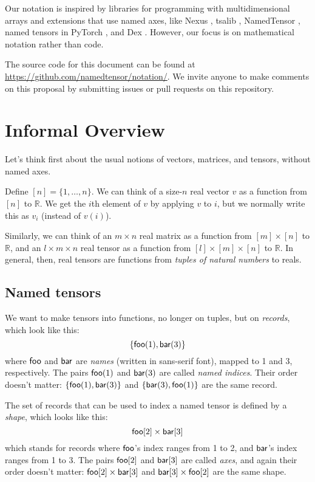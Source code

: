\documentclass{article}
\begin{document}
Our notation is inspired by libraries for programming with multidimensional arrays \citep{numpy,pytorch} and extensions that use named axes, like Nexus \citep{chen2017typesafe}, tsalib \citep{tsalib}, NamedTensor \citep{namedtensor}, named tensors in PyTorch \citep{named-tensors}, and Dex \citep{maclaurin+:2019}. However, our focus is on mathematical notation rather than code.

The source code for this document can be found at \url{https://github.com/namedtensor/notation/}. We invite anyone to make comments on this proposal by submitting issues or pull requests on this repository.

\section{Informal Overview}
\label{sec:overview}

Let's think first about the usual notions of vectors, matrices, and tensors, without named axes.

Define $[n] = \{1, \ldots, n\}$. We can think of a size-$n$ real vector $v$ as a function from $[n]$ to $\mathbb{R}$. We get the $i$th element of $v$ by applying $v$ to $i$, but we normally write this as $v_i$ (instead of $v(i)$). 

Similarly, we can think of an $m \times n$ real matrix as a function from $[m] \times [n]$ to $\mathbb{R}$, and an $l \times m \times n$ real tensor as a function from $[l] \times [m] \times [n]$ to $\mathbb{R}$. In general, then, real tensors are functions from \emph{tuples of natural numbers} to reals.

\subsection{Named tensors}

We want to make tensors into functions, no longer on tuples, but on \emph{records}, which look like this: \[\{\mathsf{foo}(1), \mathsf{bar}(3)\}\] where $\mathsf{foo}$ and $\mathsf{bar}$ are \emph{names} (written in sans-serif font), mapped to 1 and 3, respectively. The pairs $\mathsf{foo}(1)$ and $\mathsf{bar}(3)$ are called \emph{named indices}. Their order doesn't matter: $\{\mathsf{foo}(1), \mathsf{bar}(3)\}$ and $\{\mathsf{bar}(3), \mathsf{foo}(1)\}$ are the same record.

The set of records that can be used to index a named tensor is defined by a \emph{shape}, which looks like this: \[\mathsf{foo}[2] \times \mathsf{bar}[3]\] which stands for records where $\mathsf{foo}$'s index ranges from 1 to 2, and $\mathsf{bar}$'s index ranges from 1 to 3. The pairs $\mathsf{foo}[2]$ and $\mathsf{bar}[3]$ are called \emph{axes}, and again their order doesn't matter: $\mathsf{foo}[2] \times \mathsf{bar}[3]$ and $\mathsf{bar}[3] \times \mathsf{foo}[2]$ are the same shape.
\end{document}
